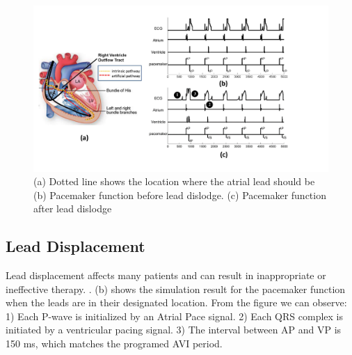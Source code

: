 \begin{figure}[t]
\centering
		\includegraphics[width=\textwidth]{figs/dislodge_all.pdf}
\caption{\small (a) Dotted line shows the location where the atrial lead should be (b) Pacemaker function before lead dislodge. (c) Pacemaker function after lead dislodge}
		\label{fig:dislodge_all}

\end{figure} 


\subsection{Lead Displacement}
Lead displacement affects many patients and can result in inappropriate or ineffective therapy. 
. (b) shows the simulation result for the pacemaker function when the leads are in their designated location. 
From the figure we can observe: 1) Each P-wave is initialized by an Atrial Pace signal. 2) Each QRS complex is initiated by a ventricular pacing signal. 3) The interval between AP and VP is 150 ms, which matches the programed AVI period.


